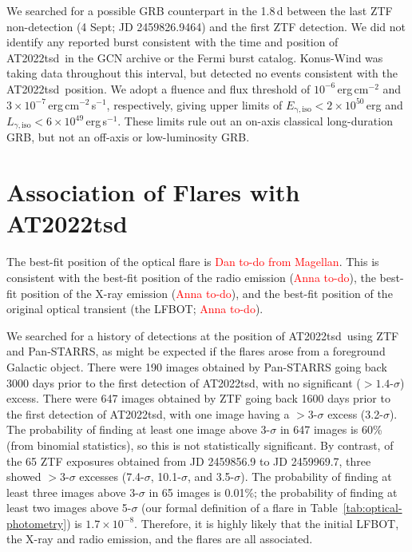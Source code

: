 \documentclass{nature_plusfigure}
\newcommand{\at}{AT2022tsd}
\begin{document}
\begin{methods}
We searched for a possible GRB counterpart in the 1.8\,d between the last ZTF non-detection (4 Sept; JD 2459826.9464) and the first ZTF detection. We did not identify any reported burst consistent with the time and position of \at\ in the GCN archive or the Fermi burst catalog. Konus-Wind was taking data throughout this interval, but detected no events consistent with the \at\ position. We adopt a  fluence and flux threshold of $10^{-6}\,$erg\,cm$^{-2}$ and $3\times10^{-7}\,$erg\,cm$^{-2}$\,s$^{-1}$, respectively\cite{Tsvetkova2017},
giving upper limits of $E_\mathrm{\gamma,iso}<2\times10^{50}\,$erg and $L_{\gamma,\mathrm{iso}}<6\times10^{49}\,$erg\,s$^{-1}$.
These limits rule out an on-axis classical long-duration GRB, but not an off-axis or low-luminosity GRB\cite{Cano2017}.

\section{Association of Flares with \at}
\label{sec:flare-association}

The best-fit position of the optical flare is \textcolor{red}{Dan to-do from Magellan}. This is consistent with the best-fit position of the radio emission (\textcolor{red}{Anna to-do}), the best-fit position of the X-ray emission (\textcolor{red}{Anna to-do}), and the best-fit position of the original optical transient (the LFBOT; \textcolor{red}{Anna to-do}). 

We searched for a history of detections at the position of \at\ using ZTF and Pan-STARRS, as might be expected if the flares arose from a foreground Galactic object. There were 190 images obtained by Pan-STARRS going back 3000 days prior to the first detection of \at, with no significant ($>1.4$-$\sigma$) excess\cite{Fulton2022}. There were 647 images obtained by ZTF going back 1600 days prior to the first detection of \at, with one image having a $>3$-$\sigma$ excess (3.2-$\sigma$). The probability of finding at least one image above 3-$\sigma$ in 647 images is 60\% (from binomial statistics), so this is not statistically significant. By contrast, of the 65 ZTF exposures obtained from JD 2459856.9 to JD 2459969.7, three showed $>3$-$\sigma$ excesses (7.4-$\sigma$, 10.1-$\sigma$, and 3.5-$\sigma$). The probability of finding at least three images above 3-$\sigma$ in 65 images is 0.01\%; the probability of finding at least two images above 5-$\sigma$ (our formal definition of a flare in Table~\ref{tab:optical-photometry}) is $1.7\times10^{-8}$. Therefore, it is highly likely that the initial LFBOT, the X-ray and radio emission, and the flares are all associated. 


\end{methods}
\end{document}
